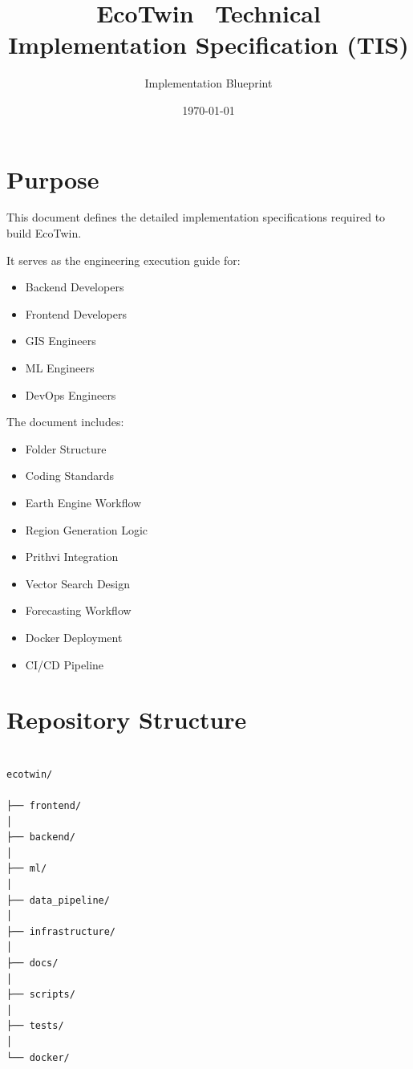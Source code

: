 \documentclass[11pt,a4paper]{article}
\title{
EcoTwin \
Technical Implementation Specification (TIS)
}
\author{
Implementation Blueprint
}
\date{\today}
\begin{document}
\maketitle
\tableofcontents
\newpage

\section{Purpose}

This document defines the detailed implementation
specifications required to build EcoTwin.

It serves as the engineering execution guide for:

\begin{itemize}
\item Backend Developers
\item Frontend Developers
\item GIS Engineers
\item ML Engineers
\item DevOps Engineers
\end{itemize}

The document includes:

\begin{itemize}
\item Folder Structure
\item Coding Standards
\item Earth Engine Workflow
\item Region Generation Logic
\item Prithvi Integration
\item Vector Search Design
\item Forecasting Workflow
\item Docker Deployment
\item CI/CD Pipeline
\end{itemize}

\section{Repository Structure}

\begin{verbatim}

ecotwin/

├── frontend/
│
├── backend/
│
├── ml/
│
├── data_pipeline/
│
├── infrastructure/
│
├── docs/
│
├── scripts/
│
├── tests/
│
└── docker/

\end{verbatim}
\end{document}
